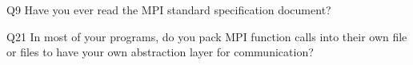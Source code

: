 \begin{description}%
\item{Q9} Have you ever read the MPI standard specification document?%
\item{Q21} In most of your programs, do you pack MPI function calls into their own file or files to have your own abstraction layer for communication?%
\end{description}%
